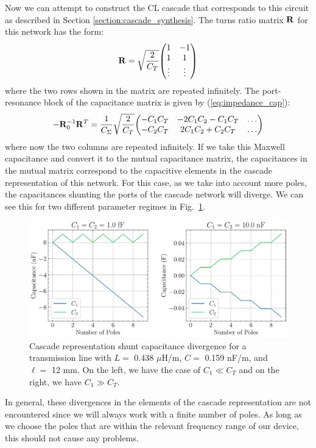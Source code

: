 Now we can attempt to construct the CL cascade that corresponds to this circuit as described in Section \ref{section:cascade_synthesis}. The turns ratio matrix $\vb{R}$ for this network has the form:
\begin{equation}
    \vb{R} = \sqrt{\frac{2}{C_T}} \mqty(1 & -1 \\ 1 & 1 \\ \vdots & \vdots)
\end{equation}
where the two rows shown in the matrix are repeated infinitely. The port-resonance block of the capacitance matrix is given by (\ref{eq:impedance_cap}):
\begin{equation}
    -\vb{R}_0^{-1}\vb{R}^T = \frac{1}{C_{\Sigma}}\sqrt{\frac{2}{C_T}} \mqty( -C_1 C_T & -2C_1C_2 - C_1C_T & \dots \\ -C_2C_T & 2C_1C_2 + C_2C_T & \dots )
\end{equation}
where now the two columns are repeated infinitely. If we take this Maxwell capacitance and convert it to the mutual capacitance matrix, the capacitances in the mutual matrix correspond to the capacitive elements in the cascade representation of this network. For this case, as we take into account more poles, the capacitances shunting the ports of the cascade network will diverge. We can see this for two different parameter regimes in Fig.\ \ref{fig:ideal_TL_shunt_cap}.

\begin{figure}[h!]
    \centering
    \includegraphics[width=\textwidth]{figures/ideal_TL_shunt_cap.pdf}
    \caption{Cascade representation shunt capacitance divergence for a transmission line with $L = $ 0.438 $\mu$H/m, $C = $ 0.159 nF/m, and $\ell =$ 12 mm. On the left, we have the case of $C_1 \ll C_T$ and on the right, we have $C_1 \gg C_T$.}
    \label{fig:ideal_TL_shunt_cap}
\end{figure}

In general, these divergences in the elements of the cascade representation are not encountered since we will always work with a finite number of poles. As long as we choose the poles that are within the relevant frequency range of our device, this should not cause any problems. 

